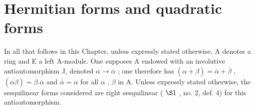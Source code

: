 \section{Hermitian forms and quadratic forms}

In all that follows in this Chapter, unless expressly stated otherwise, A denotes a ring and E a left A-module. One supposes A endowed with an involutive antiautomorphism J, denoted \(\alpha \to \overline{\alpha}\) ; one therefore has \((\overline{\alpha + \beta}) = \overline{\alpha} + \overline{\beta}\) , \((\overline{\alpha\beta}) = \overline{\beta}.\overline{\alpha}\) and \(\overline{\overline{\alpha}} = \alpha\) for all \(\alpha\) , \(\beta\) in A. Unless expressly stated otherwise, the sesquilinear forms considered are right sesquilinear ( \(\S 1\) , no. 2, def. 4) for this antiautomorphism.

